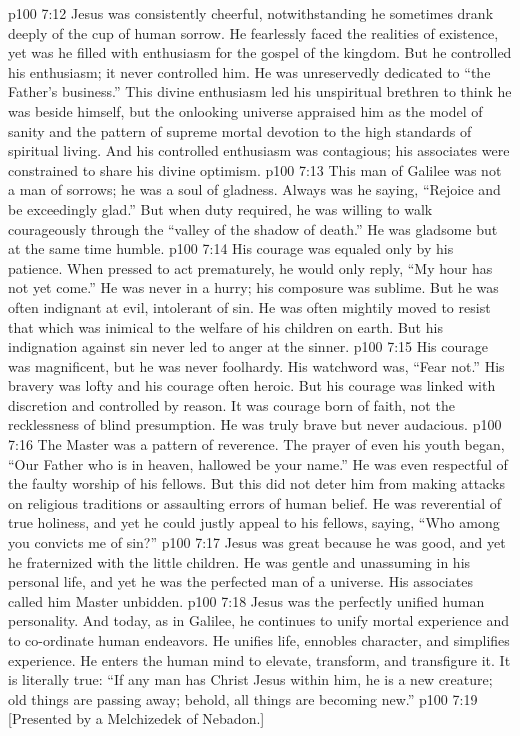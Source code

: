 \vs p100 7:12 Jesus was consistently cheerful, notwithstanding he sometimes drank deeply of the cup of human sorrow. He fearlessly faced the realities of existence, yet was he filled with enthusiasm for the gospel of the kingdom. But he controlled his enthusiasm; it never controlled him. He was unreservedly dedicated to \textcolor{ubdarkred}{“the Father’s business.”} This divine enthusiasm led his unspiritual brethren to think he was beside himself, but the onlooking universe appraised him as the model of sanity and the pattern of supreme mortal devotion to the high standards of spiritual living. And his controlled enthusiasm was contagious; his associates were constrained to share his divine optimism.
\vs p100 7:13 This man of Galilee was not a man of sorrows; he was a soul of gladness. Always was he saying, \textcolor{ubdarkred}{“Rejoice and be exceedingly glad.”} But when duty required, he was willing to walk courageously through the “valley of the shadow of death.” He was gladsome but at the same time humble.
\vs p100 7:14 His courage was equaled only by his patience. When pressed to act prematurely, he would only reply, \textcolor{ubdarkred}{“My hour has not yet come.”} He was never in a hurry; his composure was sublime. But he was often indignant at evil, intolerant of sin. He was often mightily moved to resist that which was inimical to the welfare of his children on earth. But his indignation against sin never led to anger at the sinner.
\vs p100 7:15 His courage was magnificent, but he was never foolhardy. His watchword was, \textcolor{ubdarkred}{“Fear not.”} His bravery was lofty and his courage often heroic. But his courage was linked with discretion and controlled by reason. It was courage born of faith, not the recklessness of blind presumption. He was truly brave but never audacious.
\vs p100 7:16 The Master was a pattern of reverence. The prayer of even his youth began, \textcolor{ubdarkred}{“Our Father who is in heaven, hallowed be your name.”} He was even respectful of the faulty worship of his fellows. But this did not deter him from making attacks on religious traditions or assaulting errors of human belief. He was reverential of true holiness, and yet he could justly appeal to his fellows, saying, \textcolor{ubdarkred}{“Who among you convicts me of sin?”}
\vs p100 7:17 Jesus was great because he was good, and yet he fraternized with the little children. He was gentle and unassuming in his personal life, and yet he was the perfected man of a universe. His associates called him Master unbidden.
\vs p100 7:18 Jesus was the perfectly unified human personality. And today, as in Galilee, he continues to unify mortal experience and to co\hyp{}ordinate human endeavors. He unifies life, ennobles character, and simplifies experience. He enters the human mind to elevate, transform, and transfigure it. It is literally true: “If any man has Christ Jesus within him, he is a new creature; old things are passing away; behold, all things are becoming new.”\plusone
\vsetoff
\vs p100 7:19 [Presented by a Melchizedek of Nebadon.]
